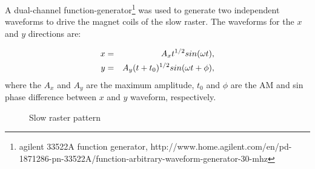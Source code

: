 \documentclass[english,review,number,sort&compress]{elsarticle}
\begin{document}
A dual-channel function-generator\footnote{agilent 33522A function generator, http://www.home.agilent.com/en/pd-1871286-pn-33522A/function-arbitrary-waveform-generator-30-mhz} was used to generate two independent waveforms to drive the magnet coils of the slow raster. The waveforms for the $x$ and $y$ directions are:

\begin{eqnarray}
x & = & A_{x}t{}^{1/2}sin(\omega t),\nonumber \\
y & = & A_{y}(t+t_{0})^{1/2}sin(\omega t+\mbox{\ensuremath{\phi}}),\label{eq:slraster_func}
\end{eqnarray}
where the $A_{x}$ and $A_{y}$ are the maximum amplitude, $t_{0}$ and $\phi$ are the AM and sin phase difference between $x$ and $y$ waveform, respectively. 
\begin{figure}[tbph]
\begin{centering}
\par\end{centering}

\protect\caption{\label{fig:Slow-raster}Slow raster pattern }
\end{figure}
\end{document}
